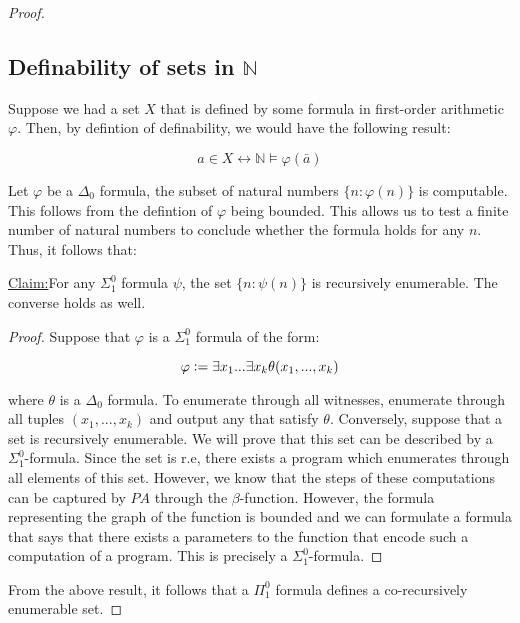 \documentclass[a4paper,10pt]{article}
\newenvironment{claim}[1]{\par\noindent\underline{Claim:}\space#1}{}
\let\phi\varphi
\newcommand*\NN{\mathbb{N}}
\newcommand*\n{\newline\par}
\newcommand*\defeq{\vcentcolon=}
\newcommand*\mo{\vDash}
\newcommand*\biject{\leftrightarrow}
\begin{document}
\begin{proof}
    \subsection{Definability of sets in $\NN$}
    
    Suppose we had a set $X$ that is defined by some formula in first-order arithmetic $\phi$. Then, by defintion of definability,  we would have the following result:
    
    \begin{equation*}
     a \in X \biject \NN \mo \phi(\bar{a})
    \end{equation*}

    Let $\phi$ be a $\Delta_0$ formula, the subset of natural numbers $\{n:\phi(n)\}$ is computable. This follows from the defintion of $\phi$ being bounded. This allows us to test a finite number of natural numbers to conclude whether the formula holds for any $n$. Thus,
    it follows that: \n
    
    
    \begin{claim}
    For any $\Sigma_1^0$ formula $\psi$, the set $\{n:\psi(n)\}$ is recursively enumerable. The converse holds as well.
    \end{claim}
    
    \begin{proof}
     Suppose that $\phi$ is a $\Sigma_1^0$ formula of the form:
	
	\begin{equation*}
	 \phi \defeq \exists x_1 ... \exists x_k \theta(x_1,...,x_k)
	\end{equation*}

	where $\theta$ is a $\Delta_0$ formula. To enumerate through all witnesses, enumerate through all tuples $(x_1,...,x_k)$ and output any that satisfy $\theta$. Conversely, suppose that a set is recursively enumerable. We will prove that 
	this set can be described by a $\Sigma_1^0$-formula. Since the set is r.e, there exists a program which enumerates through all elements of this set. However, we know that the steps of these computations can be captured by $PA$ through the 
	$\beta$-function. However, the formula representing the graph of the function is bounded and we can formulate a formula that says that there exists a parameters to the function that encode such a computation of a program. This is precisely a $\Sigma_1^0$-formula.
    \end{proof}

    From the above result, it follows that a $\Pi_1^0$ formula defines a co-recursively enumerable set.
    

\end{proof}
\end{document}
